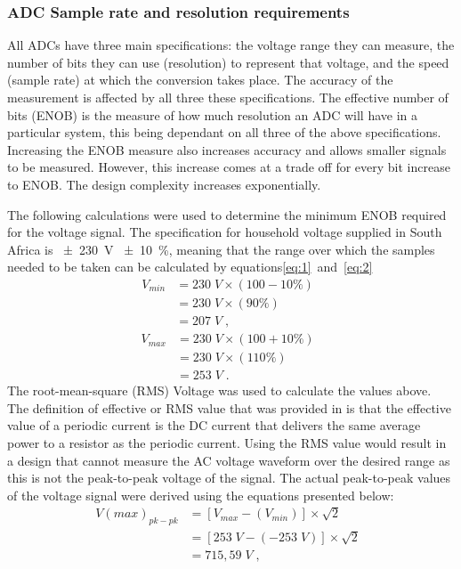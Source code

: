 \subsubsection{ADC Sample rate and resolution requirements}
\label{sec:D_V}
All ADCs have three main specifications: the voltage range they can measure, the number of bits they can use (resolution) to represent that voltage, and the speed (sample rate) at which the conversion takes place. The accuracy of the measurement is affected by all three these specifications. 
The effective number of bits (ENOB) is the measure of how much resolution an ADC will have in a particular system, this being dependant on all three of the above specifications. Increasing the ENOB measure also increases accuracy and allows smaller signals to be measured. However, this increase comes at a trade off for every bit increase to ENOB. The design complexity increases exponentially. 
\par
The following calculations were used to determine the minimum ENOB required for the voltage signal. The specification for household voltage supplied in South Africa is \qty{\pm 230}{\volt} \qty{\pm 10}{\percent}, meaning that the range over which the samples needed to be taken can be calculated by equations\ref{eq:1}~and~\ref{eq:2}
\begin{equation}
\label{eq:1}
\begin{split}
    V_{min} &= 230 \;V \times (100-10 \%) \;\;\\
            &= 230 \;V \times (90 \%) \;\;\\
            &= 207 \; V \; ,
\end{split}
\end{equation}
\begin{equation}
\label{eq:2}
\begin{split}
    V_{max} &= 230 \;V \times (100+10 \%) \;\;\\
            &= 230 \;V \times (110 \%) \;\;\\
            &= 253 \; V \; .
\end{split}
\end{equation}
The root-mean-square (RMS) Voltage was used to calculate the values above. The definition of effective or RMS value that was provided in \cite{alexander_o._2021} is that the effective value of a periodic current is the DC current that delivers the same average power to a resistor as the periodic current. Using the RMS value would result in a design that cannot measure the AC voltage waveform over the desired range as this is not the peak-to-peak voltage of the signal. The actual peak-to-peak values of the voltage signal were derived using the equations presented below:
    \begin{equation}
    \label{eq:3}
    \begin{split}
    V(max)_{pk-pk} &= [V_{max} - (V_{min})] \times \sqrt{2} \;\;\\
              &= [253 \; V - (-253 \; V)] \times \sqrt{2} \;\;\\
              &= 715,59 \; V \; ,
    \end{split}
    \end{equation}


